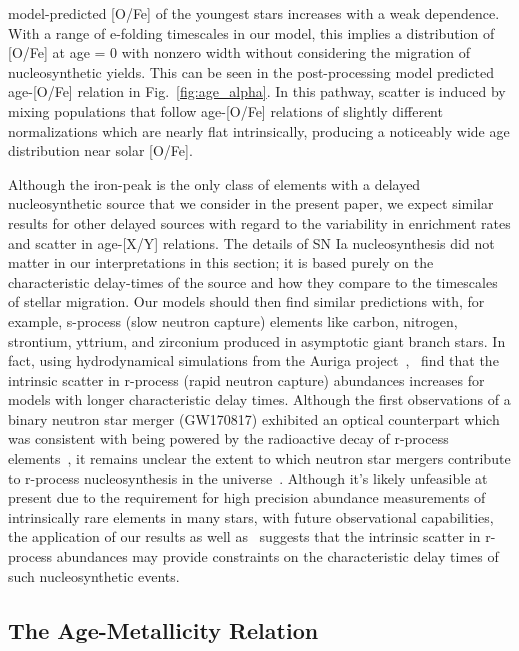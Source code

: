\documentclass[fleqn, usenatbib]{mnras}
\begin{document}
model-predicted [O/Fe] of the youngest stars increases with a weak dependence. 
With a range of e-folding timescales in our model, this implies a distribution 
of [O/Fe] at age = 0 with nonzero width without considering the migration of 
nucleosynthetic yields. This can be seen in the post-processing model 
predicted age-[O/Fe] relation in Fig.~\ref{fig:age_alpha}. In this pathway, 
scatter is induced by mixing populations that follow age-[O/Fe] relations of 
slightly different normalizations which are nearly flat intrinsically, 
producing a noticeably wide age distribution near solar [O/Fe]. 
\par 
Although the iron-peak is the only class of elements with a delayed 
nucleosynthetic source that we consider in the present paper, we expect similar 
results for other delayed sources with regard to the variability in enrichment 
rates and scatter in age-[X/Y] relations. The details of SN Ia nucleosynthesis 
did not matter in our interpretations in this section; it is based purely on 
the characteristic delay-times of the source and how they compare to the 
timescales of stellar migration. Our models should then find similar 
predictions with, for example, s-process (slow neutron capture) elements like 
carbon, nitrogen, strontium, yttrium, and zirconium produced in asymptotic 
giant branch stars. In fact, using hydrodynamical simulations from the Auriga 
project~\citep{Grand2017},~\citet{vandeVoort2020} find that the intrinsic 
scatter in r-process (rapid neutron capture) abundances increases for models 
with longer characteristic delay times. Although the first observations of a 
binary neutron star merger (GW170817) exhibited an optical counterpart which 
was consistent with being powered by the radioactive decay of r-process 
elements~\citep{Abbott2017, Coulter2017, Drout2017, Pian2017}, it remains 
unclear the extent to which neutron star mergers contribute to r-process 
nucleosynthesis in the universe~\citep{Cote2019, Mishenina2019, Siegel2019, 
vandeVoort2020, Vincenzo2021b}. Although it's likely unfeasible at present due 
to the requirement for high precision abundance measurements of intrinsically 
rare elements in many stars, with future observational capabilities, the 
application of our results as well as~\citet{vandeVoort2020} suggests that the 
intrinsic scatter in r-process abundances may provide constraints on the 
characteristic delay times of such nucleosynthetic events. 

\subsection{The Age-Metallicity Relation} 
\label{sec:obs_comp:amr} 
\end{document}
